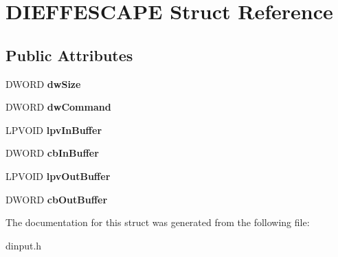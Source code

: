 \hypertarget{struct_d_i_e_f_f_e_s_c_a_p_e}{\section{D\-I\-E\-F\-F\-E\-S\-C\-A\-P\-E Struct Reference}
\label{struct_d_i_e_f_f_e_s_c_a_p_e}
}
\subsection*{Public Attributes}
\begin{DoxyCompactItemize}
\item 
\hypertarget{struct_d_i_e_f_f_e_s_c_a_p_e_a5fa7e3ee822a2c9d0dad5e603e2698a0}{D\-W\-O\-R\-D {\bfseries dw\-Size}}\label{struct_d_i_e_f_f_e_s_c_a_p_e_a5fa7e3ee822a2c9d0dad5e603e2698a0}

\item 
\hypertarget{struct_d_i_e_f_f_e_s_c_a_p_e_ab55738eb4285e685ec463b7bbeb45fae}{D\-W\-O\-R\-D {\bfseries dw\-Command}}\label{struct_d_i_e_f_f_e_s_c_a_p_e_ab55738eb4285e685ec463b7bbeb45fae}

\item 
\hypertarget{struct_d_i_e_f_f_e_s_c_a_p_e_ab07b11ed1cb5d4dea7d5daa14cf35f9a}{L\-P\-V\-O\-I\-D {\bfseries lpv\-In\-Buffer}}\label{struct_d_i_e_f_f_e_s_c_a_p_e_ab07b11ed1cb5d4dea7d5daa14cf35f9a}

\item 
\hypertarget{struct_d_i_e_f_f_e_s_c_a_p_e_aa6d0bc24a18e7388776679a5dd6eacf1}{D\-W\-O\-R\-D {\bfseries cb\-In\-Buffer}}\label{struct_d_i_e_f_f_e_s_c_a_p_e_aa6d0bc24a18e7388776679a5dd6eacf1}

\item 
\hypertarget{struct_d_i_e_f_f_e_s_c_a_p_e_a3a2b894ec95df891829bd30c41b18fc3}{L\-P\-V\-O\-I\-D {\bfseries lpv\-Out\-Buffer}}\label{struct_d_i_e_f_f_e_s_c_a_p_e_a3a2b894ec95df891829bd30c41b18fc3}

\item 
\hypertarget{struct_d_i_e_f_f_e_s_c_a_p_e_a2da389e18a79ecb19fb7860a76195315}{D\-W\-O\-R\-D {\bfseries cb\-Out\-Buffer}}\label{struct_d_i_e_f_f_e_s_c_a_p_e_a2da389e18a79ecb19fb7860a76195315}

\end{DoxyCompactItemize}


The documentation for this struct was generated from the following file\-:\begin{DoxyCompactItemize}
\item 
dinput.\-h\end{DoxyCompactItemize}
